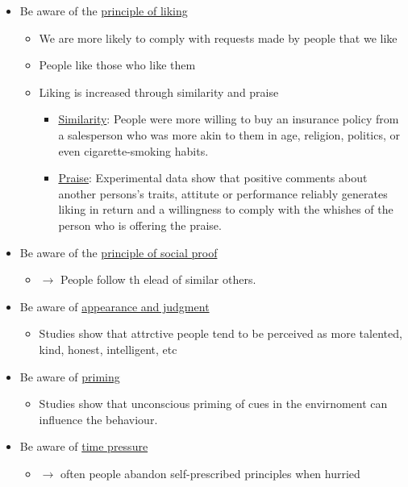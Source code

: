 \begin{itemize}
    \item Be aware of the \underline{principle of liking}
        \begin{itemize}
            \item We are more likely to comply with requests made by people
                that we like
            \item People like those who like them
            \item Liking is increased through similarity and praise
                \begin{itemize}
                    \item \underline{Similarity}: People were more willing
                        to buy an insurance policy from a salesperson who
                        was more akin to them in age, religion, politics, or
                        even cigarette-smoking habits.
                    \item \underline{Praise}: Experimental data show that
                        positive comments about another persons's traits,
                        attitute or performance reliably generates liking
                        in return and a willingness to comply with the
                        whishes of the person who is offering the praise.
                \end{itemize}
        \end{itemize}
    \item Be aware of the \underline{principle of social proof}
        \begin{itemize}
            \item $\rightarrow$ People follow th elead of similar others.
        \end{itemize}
    \item Be aware of \underline{appearance and judgment}
        \begin{itemize}
            \item Studies show that attrctive people tend to be perceived as
                more talented, kind, honest, intelligent, etc
        \end{itemize}
    \item Be aware of \underline{priming}
        \begin{itemize}
            \item Studies show that unconscious priming of cues in the envirnoment
                can influence the behaviour.
        \end{itemize}
    \item Be aware of \underline{time pressure}
        \begin{itemize}
            \item $\rightarrow$ often people abandon self-prescribed principles
                when hurried
        \end{itemize}
\end{itemize}

